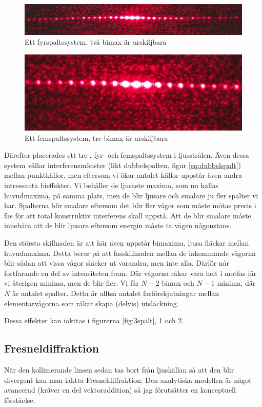 \documentclass[a4paper]{article}
\begin{document}
\begin{figure}[h!]
	\centering
	\includegraphics[width=\textwidth]{4spalt2.jpg}
	\caption{Ett fyrspaltssystem, två bimax är urskiljbara}
	\label{fig:4spalt}
\end{figure}
\begin{figure}[h!]
	\centering
	\includegraphics[height=0.1\textheight]{5spalt.jpg}
	\caption{Ett femspaltssystem, tre bimax är urskiljbara}
	\label{fig:5spalt}
\end{figure}
Därefter placerades ett tre-, fyr- och femspaltssystem i ljusstrålen. Även dessa system vållar interferensmönster (likt dubbelspalten, figur \ref{eq:dubbelspalt}) 
mellan punktkällor, men eftersom vi ökar antalet källor uppstår även andra intressanta bieffekter. Vi behåller de ljusaste maxima, som nu kallas huvudmaxima, på
samma plats, men de blir ljusare och smalare ju fler spalter vi har. Spalterna blir smalare eftersom det blir fler vågor som måste mötas precis i fas för att
total konstruktiv interferens skall uppstå. Att de blir smalare måste innebära att de blir ljusare eftersom energin måste ta vägen någonstans.

Den största skillnaden är att här även uppstår bimaxima, ljusa fläckar mellan huvudmaxima. Detta beror på att fasskillnaden mellan de inkommande vågorna blir sådan att vissa vågor släcker ut varandra, men inte alla. Därför når fortfarande en del av 
intensiteten fram. Där vågorna råkar vara helt i motfas får vi återigen minima, men de blir fler. Vi får $N-2$ bimax och $N-1$ minima, där $N$ är antalet spalter.
Detta är alltså antalet fasförskjutningar mellan elementarvågorna som råkar skapa (delvis) utsläckning. 

Dessa effekter kan iakttas i figurerna \ref{fig:3spalt}, \ref{fig:4spalt} och \ref{fig:5spalt}. 
\subsection{Fresneldiffraktion}
När den kollimerande linsen sedan tas bort från ljuskällan så att den blir divergent kan man iaktta Fresneldiffraktion. Den
analytiska modellen är något avancerad (kräver en del vektoraddition) så jag förutsätter en konceptuell förståelse. 
\end{document}
